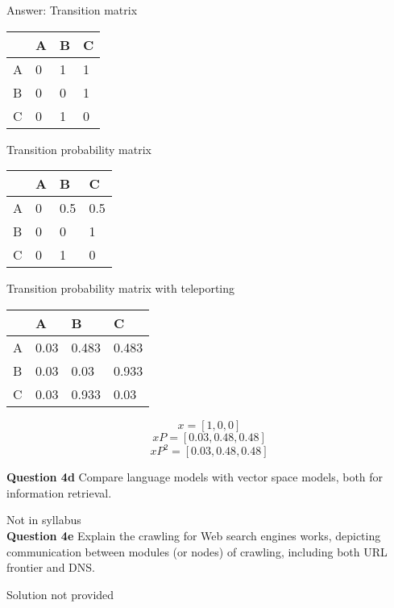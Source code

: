 \documentclass[11pt,a4paper]{report}
\begin{document}
\begin{multicols*}{2}
\begin{center}
\end{center}

\noindent Answer: Transition matrix
\begin{center}
\begin{tabular}{ |l|l|l|l| }
    \hline
      & A  & B  & C \\
    \hline
    A & 0  & 1  & 1  \\
    B & 0  & 0  & 1  \\
    C & 0  & 1  & 0  \\
    \hline
\end{tabular}
\end{center}

\noindent Transition probability matrix
\begin{center}
\begin{tabular}{ |l|l|l|l| }
    \hline
      & A    & B  & C \\
    \hline
    A & 0    & 0.5 & 0.5  \\
    B & 0    & 0   & 1    \\
    C & 0    & 1   & 0    \\
    \hline
\end{tabular}
\end{center}

\noindent Transition probability matrix with teleporting
\begin{center}
\begin{tabular}{ |l|l|l|l| }
    \hline
      & A    & B    & C      \\
    \hline
    A & 0.03  & 0.483 & 0.483  \\
    B & 0.03  & 0.03  & 0.933 \\
    C & 0.03  & 0.933 & 0.03  \\
    \hline
\end{tabular}
\end{center}

$$x = [1,0,0]$$
$$xP = [0.03, 0.48, 0.48]$$
$$xP^2 = [0.03, 0.48, 0.48]$$

\noindent \textbf{Question 4d} Compare language models with vector space models, both for information retrieval.

\noindent Not in syllabus\\

\noindent \textbf{Question 4e} Explain the crawling for Web search engines works, depicting communication between modules (or nodes) of crawling, including both URL frontier and DNS.

\noindent Solution not provided

\end{multicols*}
\end{document}

